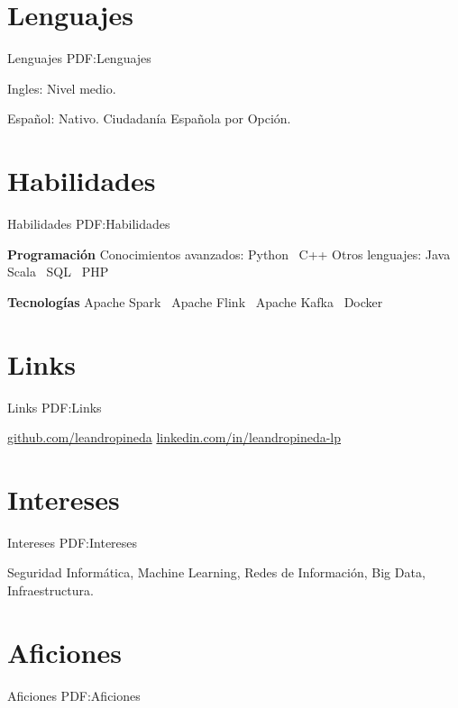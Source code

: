 \documentclass[letterpaper,MMMyyyy,nonstop]{simpleresumecv}
\begin{document}
\begin{body}

\section
{Lenguajes}
{Lenguajes}
{PDF:Lenguajes}

\BulletItem
Ingles: Nivel medio.

\GapNoBreak
\BulletItem
Español: Nativo.
\GapNoBreak
\BulletItem
Ciudadanía Española por Opción.


\section
{Habilidades}
{Habilidades}
{PDF:Habilidades}

\textbf{Programación}
\BulletItem
Conocimientos avanzados: Python \SubBulletSymbol\, C++
\BulletItem
Otros lenguajes: Java \SubBulletSymbol\, Scala \SubBulletSymbol\, SQL \SubBulletSymbol\, PHP

\textbf{Tecnologías}
\BulletItem Apache Spark \SubBulletSymbol\, Apache Flink \SubBulletSymbol\, Apache Kafka \SubBulletSymbol\, Docker


\section
{Links}
{Links}
{PDF:Links}

\BulletItem
\href{https://github.com/leandropineda}{github.com/leandropineda}
\BulletItem
\href{https://www.linkedin.com/in/leandropineda-lp}{linkedin.com/in/leandropineda-lp}


\section
{Intereses}
{Intereses}
{PDF:Intereses}

Seguridad Informática, Machine Learning, Redes de Información, Big Data, Infraestructura.



\section
{Aficiones}
{Aficiones}
{PDF:Aficiones}


\end{body}
\end{document}
